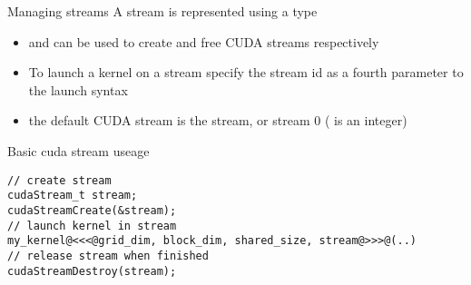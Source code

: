 \begin{frame}[fragile]{}
    \begin{info}{Managing streams}
        A stream is represented using a  type
        \begin{itemize}
            \item {} and  can be used to create and free CUDA streams respectively
            \item To launch a kernel on a stream specify the stream id as a fourth parameter to the launch syntax \\
                \begin{center}  \end{center}
            \item the default CUDA stream is the  stream, or stream 0 ( is an integer)
        \end{itemize}
    \end{info}

    \begin{code}{Basic cuda stream useage}
        \begin{lstlisting}[style=boxcudatiny]
// create stream
cudaStream_t stream;
cudaStreamCreate(&stream);
// launch kernel in stream
my_kernel@<<<@grid_dim, block_dim, shared_size, stream@>>>@(..)
// release stream when finished
cudaStreamDestroy(stream);
        \end{lstlisting}
\end{code}

\end{frame}

